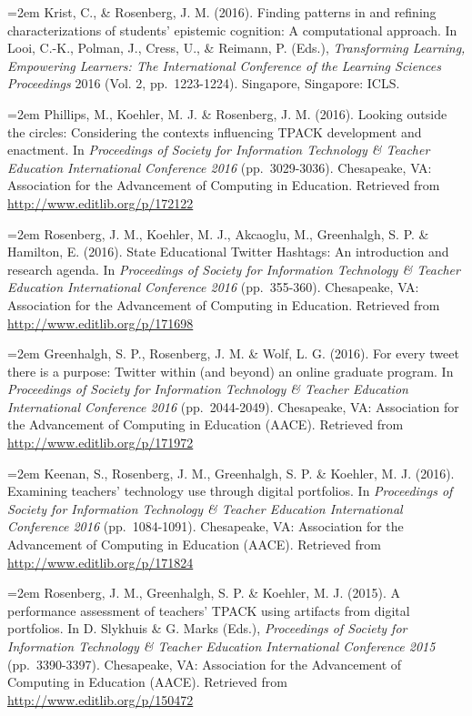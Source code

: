 \documentclass[]{article}
\begin{document}
\hangindent=2em Krist, C., \& Rosenberg, J. M. (2016). Finding patterns
in and refining characterizations of students' epistemic cognition: A
computational approach. In Looi, C.-K., Polman, J., Cress, U., \&
Reimann, P. (Eds.), \emph{Transforming Learning, Empowering Learners:
The International Conference of the Learning Sciences Proceedings} 2016
(Vol. 2, pp.~1223-1224). Singapore, Singapore: ICLS.

\hangindent=2em Phillips, M., Koehler, M. J. \& Rosenberg, J. M. (2016).
Looking outside the circles: Considering the contexts influencing TPACK
development and enactment. In \emph{Proceedings of Society for
Information Technology \& Teacher Education International Conference
2016} (pp.~3029-3036). Chesapeake, VA: Association for the Advancement
of Computing in Education. Retrieved from
\url{http://www.editlib.org/p/172122}

\hangindent=2em Rosenberg, J. M., Koehler, M. J., Akcaoglu, M.,
Greenhalgh, S. P. \& Hamilton, E. (2016). State Educational Twitter
Hashtags: An introduction and research agenda. In \emph{Proceedings of
Society for Information Technology \& Teacher Education International
Conference 2016} (pp.~355-360). Chesapeake, VA: Association for the
Advancement of Computing in Education. Retrieved from
\url{http://www.editlib.org/p/171698}

\hangindent=2em Greenhalgh, S. P., Rosenberg, J. M. \& Wolf, L. G.
(2016). For every tweet there is a purpose: Twitter within (and beyond)
an online graduate program. In \emph{Proceedings of Society for
Information Technology \& Teacher Education International Conference
2016} (pp.~2044-2049). Chesapeake, VA: Association for the Advancement
of Computing in Education (AACE). Retrieved from
\url{http://www.editlib.org/p/171972}

\hangindent=2em Keenan, S., Rosenberg, J. M., Greenhalgh, S. P. \&
Koehler, M. J. (2016). Examining teachers' technology use through
digital portfolios. In \emph{Proceedings of Society for Information
Technology \& Teacher Education International Conference 2016}
(pp.~1084-1091). Chesapeake, VA: Association for the Advancement of
Computing in Education (AACE). Retrieved from
\url{http://www.editlib.org/p/171824}

\hangindent=2em Rosenberg, J. M., Greenhalgh, S. P. \& Koehler, M. J.
(2015). A performance assessment of teachers' TPACK using artifacts from
digital portfolios. In D. Slykhuis \& G. Marks (Eds.), \emph{Proceedings
of Society for Information Technology \& Teacher Education International
Conference 2015} (pp.~3390-3397). Chesapeake, VA: Association for the
Advancement of Computing in Education (AACE). Retrieved from
\url{http://www.editlib.org/p/150472}
\end{document}
